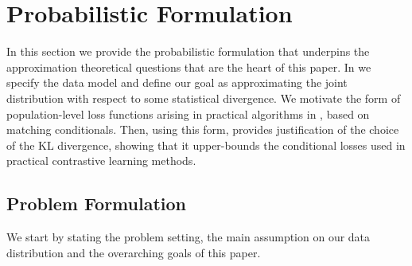 \documentclass{article}
\begin{document}
\section{Probabilistic Formulation}
\label{sec:Setting}

In this section we provide the probabilistic formulation that underpins the
approximation theoretical questions that are the heart of this paper. In
 we specify the data model and
define our goal as approximating the joint distribution with respect to
some statistical divergence. We motivate the form of population-level loss
functions arising in practical algorithms in , based on
matching conditionals. Then, using this form,
 provides justification
of the choice of the KL divergence, showing that it upper-bounds the
conditional losses used in practical contrastive learning methods.

\subsection{Problem Formulation}
\label{subsec:SettingProblemFormulation}
We start by stating the problem setting, the main assumption on our data
distribution and the overarching goals of this paper.
\end{document}
